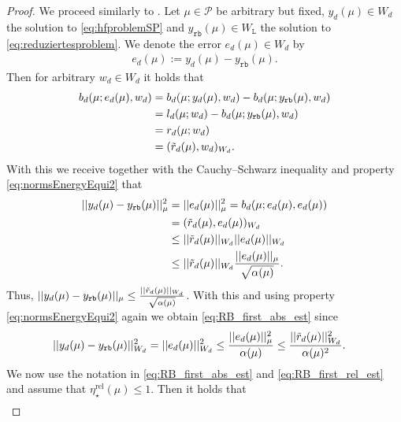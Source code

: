 \documentclass{article}
\theoremstyle{plain}
\theoremstyle{definition}
\theoremstyle{remark}
\newcommand{\RBestFineREL}{\eta_\star^\text{rel}}
\begin{document}
\begin{proof}
We proceed similarly to \cites[Prop.~4.4]{Hesthaven2016}[Prop.~2.24, 2.27]{haasdonk2017reduced}. Let $\mu \in \mathcal{P}$ be arbitrary but fixed, $y_d(\mu) \in W_d$ the solution to \eqref{eq:hfproblemSP} and $y_{\texttt{rb}}(\mu) \in W_\texttt{L}$ the solution to \eqref{eq:reduziertesproblem}. We denote the error $e_d(\mu) \in W_d$ by
\begin{align}
    e_d(\mu) := y_d(\mu) - y_\texttt{rb}(\mu).
\end{align}
Then for arbitrary $w_d \in W_d$ it holds that
\begin{align}
    b_d(\mu; e_d(\mu), w_d) &= b_d(\mu; y_d(\mu), w_d) - b_d(\mu; y_{\texttt{rb}}(\mu), w_d) \\
    &= l_d(\mu; w_d) - b_d(\mu; y_{\texttt{rb}}(\mu), w_d) \\
    &= r_d(\mu; w_d) \\
    & = (\Tilde{r}_d(\mu), w_d)_{W_d} .
\end{align}
With this we receive together with the Cauchy–Schwarz inequality and property \eqref{eq:normsEnergyEqui2} that
\begin{align}
    \vert \vert y_{d}(\mu) - y_{\texttt{rb}}(\mu) \vert \vert_\mu^2 &= \vert \vert e_d(\mu) \vert \vert_\mu^2 = b_d(\mu; e_d(\mu), e_d(\mu)) \\
    &= (\Tilde{r}_d(\mu), e_d(\mu))_{W_d} \\
    &\leq \vert \vert \Tilde{r}_d(\mu) \vert \vert_{W_d} \vert \vert e_d(\mu) \vert \vert_{W_d} \\
    &\leq \vert \vert \Tilde{r}_d(\mu) \vert \vert_{W_d} \frac{\vert \vert e_d(\mu) \vert \vert_\mu}{\sqrt{\alpha(\mu)}}.
\end{align}
Thus, $\vert \vert y_{d}(\mu) - y_{\texttt{rb}}(\mu) \vert \vert_\mu \leq \frac{\vert \vert \Tilde{r}_d(\mu) \vert \vert_{W_d}}{\sqrt{\alpha(\mu)}}$. With this and using property \eqref{eq:normsEnergyEqui2} again we obtain \eqref{eq:RB_first_abs_est} since
\begin{align}
    \vert \vert y_{d}(\mu) - y_{\texttt{rb}}(\mu) \vert \vert_{W_d}^2 &= \vert \vert e_d(\mu) \vert \vert_{W_d}^2 \leq \frac{\vert \vert e_d(\mu) \vert \vert_{\mu}^2}{\alpha(\mu)} \leq \frac{\vert \vert \Tilde{r}_d(\mu) \vert \vert_{W_d}^2}{\alpha(\mu)^2}.
\end{align}
%
We now use the notation in \eqref{eq:RB_first_abs_est} and \eqref{eq:RB_first_rel_est} and assume that $\RBestFineREL(\mu) \leq 1$. Then it holds that
\begin{align}

\end{align}
\end{proof}
\end{document}
